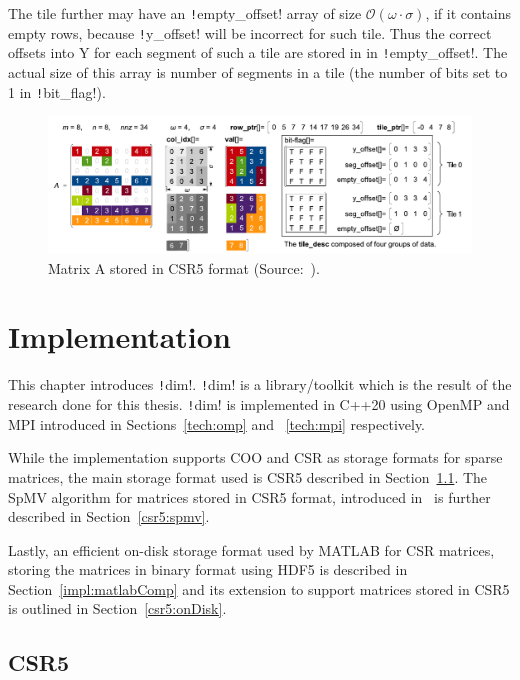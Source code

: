 \documentclass[thesis=M,english]{FITthesis}[2019/12/23]
\newcommand{\csre}[1]{\texttt!#1!}
\begin{document}
The tile further may have an \csre{empty_offset} array of size \(\mathcal{O}(\omega \cdot \sigma)\), if it contains empty rows,
because \csre{y_offset} will be incorrect for such tile. Thus the correct offsets into Y  for each segment of such
a tile are stored in in \csre{empty_offset}. The actual size of this array is number of segments in a tile (the number of bits set to 1 in \csre{bit_flag}).

\begin{figure}[htp]
    \centering
    \includegraphics[scale=0.7]{static/A_csr5.pdf}
    \caption{Matrix A stored in CSR5 format (Source:~\cite{liu2015csr5}).}
\end{figure}



\chapter{Implementation}

This chapter introduces \csre{dim}. \csre{dim} is a library/toolkit which is the result of the research done for this
thesis. \csre{dim} is implemented in C++20 using OpenMP and MPI introduced in Sections~\ref{tech:omp} and
~\ref{tech:mpi} respectively.

While the implementation supports COO and CSR as storage formats for sparse matrices, the main storage
format used is CSR5 described in Section~\ref{impl:csr5}. The SpMV algorithm for matrices stored in CSR5
format, introduced in~\cite{liu2015csr5} is further described in Section~\ref{csr5:spmv}.

Lastly, an efficient on-disk storage format used by MATLAB for CSR matrices, storing the matrices in
binary format using HDF5 is described in Section~\ref{impl:matlabComp} and its extension to support
matrices stored in CSR5 is outlined in Section~\ref{csr5:onDisk}.

\section{CSR5}\label{impl:csr5}
\end{document}
